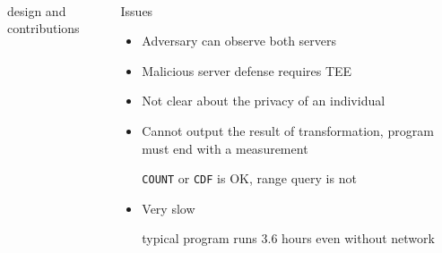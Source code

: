\begin{frame}{\crypte~\cite{crypte}}
\begin{columns}[T,onlytextwidth]
\begin{block}{\crypte{} design and contributions}
					\end{block}


					\begin{block}{Issues}

						\begin{itemize}
							\item Adversary can observe both servers
							\item Malicious server defense requires TEE
							\item Not clear about the privacy of an individual
							\item Cannot output the result of transformation, program must end with a measurement \\
								\begin{small}
									\texttt{COUNT} or \texttt{CDF} is OK, range query is not
								\end{small}
							\item Very slow \\
							\begin{small}
								typical program runs 3.6 hours even without network
							\end{small}
						\end{itemize}

					\end{block}

			\end{columns}

		\end{frame}

